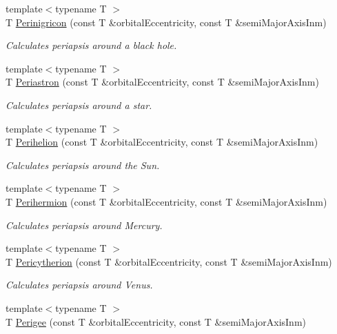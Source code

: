 \begin{DoxyCompactItemize}
{\footnotesize template$<$typename T $>$ }\\T \mbox{\hyperlink{group___e_g_x_phys-_periapsis_ga2de34009308e46d1d3bd4eb8cd4b0a8d}{Perinigricon}} (const T \&orbital\+Eccentricity, const T \&semi\+Major\+Axis\+Inm)
\begin{DoxyCompactList}\small\item\em Calculates periapsis around a black hole. \end{DoxyCompactList}\item 
{\footnotesize template$<$typename T $>$ }\\T \mbox{\hyperlink{group___e_g_x_phys-_periapsis_gaf3c623561998f107496fb7341698ae9d}{Periastron}} (const T \&orbital\+Eccentricity, const T \&semi\+Major\+Axis\+Inm)
\begin{DoxyCompactList}\small\item\em Calculates periapsis around a star. \end{DoxyCompactList}\item 
{\footnotesize template$<$typename T $>$ }\\T \mbox{\hyperlink{group___e_g_x_phys-_periapsis_ga10f870e17f51680c5df8731c1a7848cf}{Perihelion}} (const T \&orbital\+Eccentricity, const T \&semi\+Major\+Axis\+Inm)
\begin{DoxyCompactList}\small\item\em Calculates periapsis around the Sun. \end{DoxyCompactList}\item 
{\footnotesize template$<$typename T $>$ }\\T \mbox{\hyperlink{group___e_g_x_phys-_periapsis_ga4e2090fddafea2fca70acd6f7a1eddc4}{Perihermion}} (const T \&orbital\+Eccentricity, const T \&semi\+Major\+Axis\+Inm)
\begin{DoxyCompactList}\small\item\em Calculates periapsis around Mercury. \end{DoxyCompactList}\item 
{\footnotesize template$<$typename T $>$ }\\T \mbox{\hyperlink{group___e_g_x_phys-_periapsis_ga8abbd484b4a6e0958000c91644cbb8ee}{Pericytherion}} (const T \&orbital\+Eccentricity, const T \&semi\+Major\+Axis\+Inm)
\begin{DoxyCompactList}\small\item\em Calculates periapsis around Venus. \end{DoxyCompactList}\item 
{\footnotesize template$<$typename T $>$ }\\T \mbox{\hyperlink{group___e_g_x_phys-_periapsis_gac6e1edb1916ff1a37f4bc0b01e6511d4}{Perigee}} (const T \&orbital\+Eccentricity, const T \&semi\+Major\+Axis\+Inm)

\end{DoxyCompactItemize}
